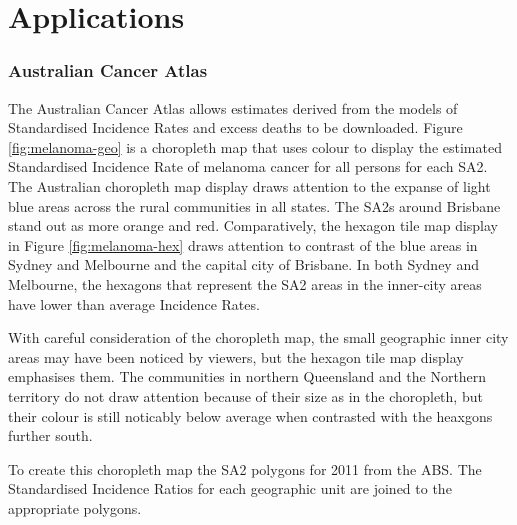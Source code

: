 \documentclass{monashthesis}
\begin{document}
\hypertarget{applications}{%
\section{Applications}\label{applications}}

\hypertarget{australian-cancer-atlas}{%
\subsubsection{Australian Cancer Atlas}\label{australian-cancer-atlas}}

The Australian Cancer Atlas \autocite{TACA} allows estimates derived from the models of Standardised Incidence Rates and excess deaths to be downloaded.
Figure \ref{fig:melanoma-geo} is a choropleth map that uses colour to display the estimated Standardised Incidence Rate of melanoma cancer for all persons for each SA2. The Australian choropleth map display draws attention to the expanse of light blue areas across the rural communities in all states. The SA2s around Brisbane stand out as more orange and red.
Comparatively, the hexagon tile map display in Figure \ref{fig:melanoma-hex} draws attention to contrast of the blue areas in Sydney and Melbourne and the capital city of Brisbane. In both Sydney and Melbourne, the hexagons that represent the SA2 areas in the inner-city areas have lower than average Incidence Rates.

With careful consideration of the choropleth map, the small geographic inner city areas may have been noticed by viewers, but the hexagon tile map display emphasises them. The communities in northern Queensland and the Northern territory do not draw attention because of their size as in the choropleth, but their colour is still noticably below average when contrasted with the heaxgons further south.

To create this choropleth map the SA2 polygons for 2011 from the ABS. The Standardised Incidence Ratios for each geographic unit are joined to the appropriate polygons.
\end{document}
